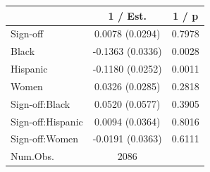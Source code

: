 
\begin{tabular}[t]{lcc}
\toprule
  & 1 / Est. & 1 / p\\
\midrule
Sign-off & 0.0078 
(0.0294) & 0.7978\\
Black & -0.1363 
(0.0336) & 0.0028\\
Hispanic & -0.1180 
(0.0252) & 0.0011\\
Women & 0.0326 
(0.0285) & 0.2818\\
Sign-off:Black & 0.0520 
(0.0577) & 0.3905\\
Sign-off:Hispanic & 0.0094 
(0.0364) & 0.8016\\
Sign-off:Women & -0.0191 
(0.0363) & 0.6111\\
\midrule
Num.Obs. & 2086 & \\
\bottomrule
\end{tabular}
